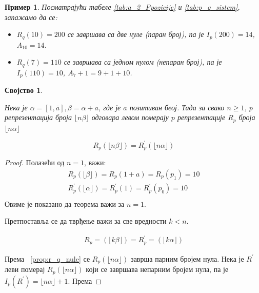 \documentclass[a4paper]{article}
\newtheorem{example}{Пример}
\newtheorem{property}{Својство}
\begin{document}
\begin{example}
	Посматрајући табеле \ref{tab:a_2_Ppozicije} и \ref{tab:p_q_sistem}, запажамо да се:
	\begin{itemize}
		\item $ R_q(10) = 200 $ се завршава са две нуле (паран број), па је $ I_{p}(200) = 14 $, $ A_{10} = 14 $.
		\item $ R_q(7) = 110 $ се завршава са једном нулом (непаран број), па је $ I_{p}(110) = 10 $, $ A_{7} + 1 = 9 + 1 + 10  $.
	\end{itemize}
\end{example}

\begin{property}
	\label{prop:levi_pomeraj}

	Нека је $ \alpha = [1,\overline{a}], \beta = \alpha + a $, где је $ a $ позитиван беој. Тада за свако $ n \geq 1 $, $ p $ репрезентација броја $ \lfloor n \beta \rfloor $ одговара левом померају $ p $ репрезентације $ 
	R_{p} $ броја  $ \lfloor n \alpha \rfloor $
	
		\begin{displaymath}
			R_{p} (\lfloor n \beta \rfloor) = R_{p}^{'} (\lfloor n \alpha \rfloor) 
		\end{displaymath}

\end{property}

\begin{proof}
	Полазећи од $ n = 1 $, важи:
		\begin{eqnarray*}
			R_{p}(\lfloor \beta \rfloor) = R_{p}(1 + a) = R_{p}(p_{1}) = 10\\
			R_{p}^{'}(\lfloor \alpha \rfloor) = R_{p}^{'}(1) = R_{p}^{'}(p_{0}) = 10\\ 
		\end{eqnarray*}
	Овиме је показано да теорема важи за $ n = 1 $.
	
	Претпоставља се да тврђење важи за све вредности $ k < n $.
	
		\begin{eqnarray*}
			R_{p} = (\lfloor k\beta \rfloor) = R_{p}^{'} = (\lfloor k\alpha \rfloor)
		\end{eqnarray*}
	
	Према ~\eqref{prop:r_q_nule} се $ R_{p}(\lfloor n\alpha \rfloor) $ заврша парним бројем нула. Нека је $ R^{'} $ леви померај $ R_{p}(\lfloor n\alpha \rfloor) $ који се завршава непарним бројем нула, па је $ I_{p}(R^{'}) = \lfloor n\alpha \rfloor + 1$. Према
\end{proof}
\end{document}
